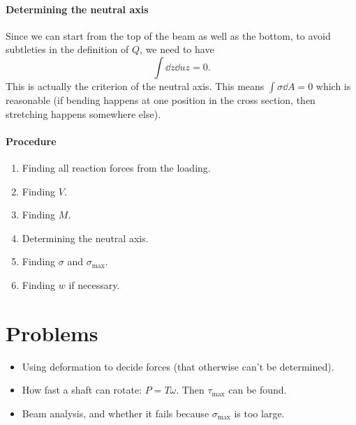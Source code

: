 \documentclass[hyperref, a4paper]{article}
\begin{document}
\paragraph*{Determining the neutral axis} Since we can start from the top of the beam 
as well as the bottom, 
to avoid subtleties in the definition of $Q$,
we need to have 
\begin{equation}
    \int \dd{z} \dd{u} z = 0.
\end{equation}
This is actually the criterion of the neutral axis.
This means $\int \sigma \dd{A} = 0$ which is reasonable 
(if bending happens at one position in the cross section, 
then stretching happens somewhere else).

\paragraph*{Procedure} 
\begin{enumerate}
    \item Finding all reaction forces from the loading.
    \item Finding $V$. 
    \item Finding $M$.
    \item Determining the neutral axis.
    \item Finding $\sigma$ and $\sigma_{\text{max}}$.
    \item Finding $w$ if necessary.
\end{enumerate}

\section{Problems}

\begin{itemize}
    \item Using deformation to decide forces (that otherwise can't be determined).
    \item How fast a shaft can rotate: $P = T \omega$. Then $\tau_{\text{max}}$ can be found.
    \item Beam analysis, and whether it fails because $\sigma_{\text{max}}$ is too large.
\end{itemize}
\end{document}

